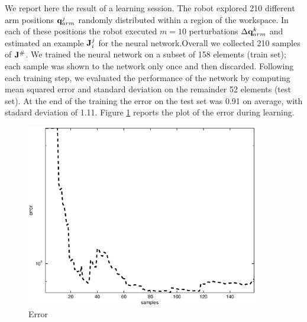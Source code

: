 We report here the result of a learning session. The robot explored 210 different 
arm positions $\mathbf q_{arm}^j$ randomly distributed within a region of the workspace. In 
each of these positions the robot executed $m=10$ perturbations 
$\Delta \mathbf {q}_{arm}^k$ and estimated an example $\mathbf J_i^j$ for the neural network.Overall
we collected 210 samples of $\mathbf J^\#$. We trained the neural network on a 
subset of 158 elements (train set); each sample was shown to the network only once 
and then discarded. Following each training step, we evaluated the performance of 
the network by computing mean squared error and standard deviation on the 
remainder 52 elements (test set). At the end of the training the error on the test 
set was 0.91 on average, with stadard deviation of 1.11. Figure 
\ref{fig:jacobian-error} reports the plot of the error during learning.
%
\begin{figure}[tbp]
\label{fig:jacobian-error}
\centerline{
\includegraphics[width=4.0in, angle=0 ]{./Figure/jacobian-error.eps}
} \caption{Error} 
\end{figure}
%



